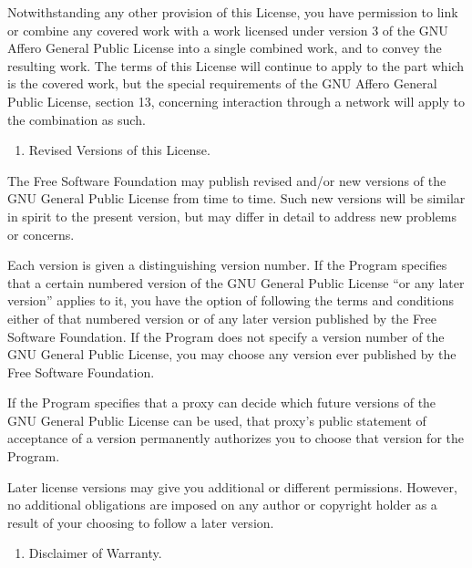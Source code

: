 \documentclass[letterpaper,10pt,english]{sphinxmanual}
\begin{document}
\sphinxAtStartPar
Notwithstanding any other provision of this License, you have permission to link or combine any covered work with a work licensed under version 3 of the GNU Affero General Public License into a single combined work, and to convey the resulting work. The terms of this License will continue to apply to the part which is the covered work, but the special requirements of the GNU Affero General Public License, section 13, concerning interaction through a network will apply to the combination as such.
\begin{enumerate}
%
\setcounter{enumi}{13}
\item {} 
\sphinxAtStartPar
Revised Versions of this License.

\end{enumerate}

\sphinxAtStartPar
The Free Software Foundation may publish revised and/or new versions of the GNU General Public License from time to time. Such new versions will be similar in spirit to the present version, but may differ in detail to address new problems or concerns.

\sphinxAtStartPar
Each version is given a distinguishing version number. If the Program specifies that a certain numbered version of the GNU General Public License “or any later version” applies to it, you have the option of following the terms and conditions either of that numbered version or of any later version published by the Free Software Foundation. If the Program does not specify a version number of the GNU General Public License, you may choose any version ever published by the Free Software Foundation.

\sphinxAtStartPar
If the Program specifies that a proxy can decide which future versions of the GNU General Public License can be used, that proxy’s public statement of acceptance of a version permanently authorizes you to choose that version for the Program.

\sphinxAtStartPar
Later license versions may give you additional or different permissions. However, no additional obligations are imposed on any author or copyright holder as a result of your choosing to follow a later version.
\begin{enumerate}
%
\setcounter{enumi}{14}
\item {} 
\sphinxAtStartPar
Disclaimer of Warranty.

\end{enumerate}
\end{document}
